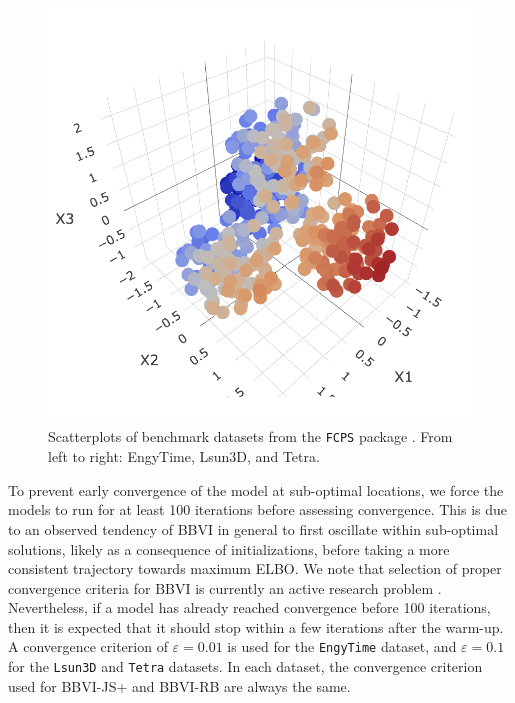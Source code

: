 \documentclass{article}
\begin{document}
\begin{figure}[ht]
\begin{multicols}{3}
    \includegraphics[width=\linewidth]{tetra.png}\par 
    \end{multicols}
  \caption{\label{fig:benchmarks} Scatterplots of benchmark datasets from the \texttt{FCPS} package \cite{FCPS}. From left to right: EngyTime, Lsun3D, and Tetra.}
\end{figure}

To prevent early convergence of the model at sub-optimal locations, we force the models to run for at least 100 iterations before assessing convergence. This is due to an observed tendency of BBVI in general to first oscillate within sub-optimal solutions, likely as a consequence of initializations, before taking a more consistent trajectory towards maximum ELBO. We note that selection of proper convergence criteria for BBVI is currently an active research problem \cite{Ranganath-2014, Welandawe-2022}. Nevertheless, if a model has already reached convergence before 100 iterations, then it is expected that it should stop within a few iterations after the warm-up. A convergence criterion of $\varepsilon = 0.01$ is used for the \texttt{EngyTime} dataset, and $\varepsilon = 0.1$ for the \texttt{Lsun3D} and \texttt{Tetra} datasets. In each dataset, the convergence criterion used for BBVI-JS+ and BBVI-RB are always the same.
\end{document}
